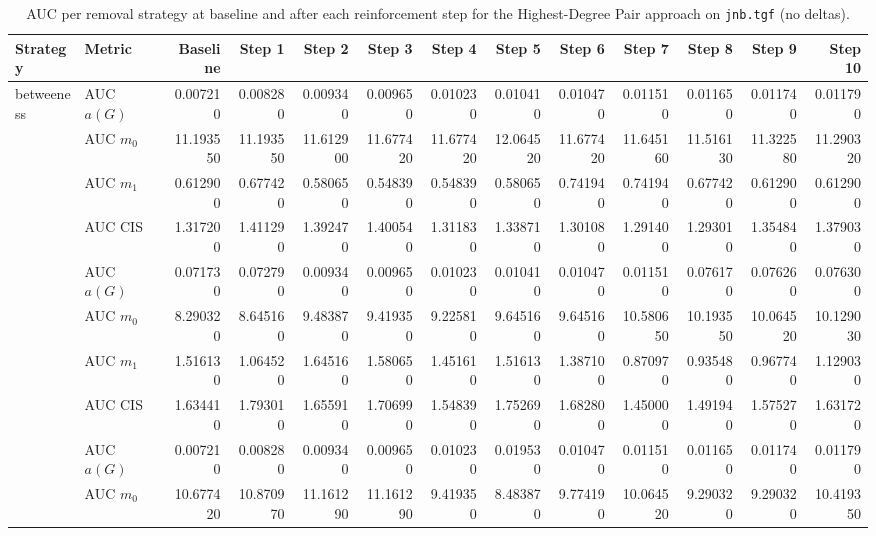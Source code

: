 \begin{table}[htbp]
  \centering
  \caption{AUC per removal strategy at baseline and after each reinforcement step for the Highest-Degree Pair approach on \texttt{jnb.tgf} (no deltas).}
  \label{tab:jnb-highest_degree_pair-auc}
\setlength{\tabcolsep}{2.5pt}
  \begin{tabular}{llrrrrrrrrrrr}
    \toprule
    \textbf{Strategy} & \textbf{Metric} & \textbf{Baseline} & \textbf{Step 1} & \textbf{Step 2} & \textbf{Step 3} & \textbf{Step 4} & \textbf{Step 5} & \textbf{Step 6} & \textbf{Step 7} & \textbf{Step 8} & \textbf{Step 9} & \textbf{Step 10} \\
    \midrule
    \multirow{4}{*}{betweeness} & AUC $a(G)$ & 0.007210 & 0.008280 & 0.009340 & 0.009650 & 0.010230 & 0.010410 & 0.010470 & 0.011510 & 0.011650 & 0.011740 & 0.011790 \\
    & AUC $m_0$ & 11.193550 & 11.193550 & 11.612900 & 11.677420 & 11.677420 & 12.064520 & 11.677420 & 11.645160 & 11.516130 & 11.322580 & 11.290320 \\
    & AUC $m_1$ & 0.612900 & 0.677420 & 0.580650 & 0.548390 & 0.548390 & 0.580650 & 0.741940 & 0.741940 & 0.677420 & 0.612900 & 0.612900 \\
    & AUC CIS & 1.317200 & 1.411290 & 1.392470 & 1.400540 & 1.311830 & 1.338710 & 1.301080 & 1.291400 & 1.293010 & 1.354840 & 1.379030 \\
    \addlinespace
    \multirow{4}{*}{closeness} & AUC $a(G)$ & 0.071730 & 0.072790 & 0.009340 & 0.009650 & 0.010230 & 0.010410 & 0.010470 & 0.011510 & 0.076170 & 0.076260 & 0.076300 \\
    & AUC $m_0$ & 8.290320 & 8.645160 & 9.483870 & 9.419350 & 9.225810 & 9.645160 & 9.645160 & 10.580650 & 10.193550 & 10.064520 & 10.129030 \\
    & AUC $m_1$ & 1.516130 & 1.064520 & 1.645160 & 1.580650 & 1.451610 & 1.516130 & 1.387100 & 0.870970 & 0.935480 & 0.967740 & 1.129030 \\
    & AUC CIS & 1.634410 & 1.793010 & 1.655910 & 1.706990 & 1.548390 & 1.752690 & 1.682800 & 1.450000 & 1.491940 & 1.575270 & 1.631720 \\
    \addlinespace
    \multirow{4}{*}{core influence} & AUC $a(G)$ & 0.007210 & 0.008280 & 0.009340 & 0.009650 & 0.010230 & 0.019530 & 0.010470 & 0.011510 & 0.011650 & 0.011740 & 0.011790 \\
    & AUC $m_0$ & 10.677420 & 10.870970 & 11.161290 & 11.161290 & 9.419350 & 8.483870 & 9.774190 & 10.064520 & 9.290320 & 9.290320 & 10.419350 \\

\end{tabular}
\end{table}
